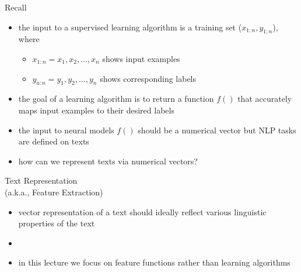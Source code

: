 \begin{frame}{Recall}
    \begin{itemize}
        \item<1-> the input to a supervised learning algorithm is a training set ($x_{1:n}, y_{1:n}$), where
        \begin{itemize}
            \item<2-> $x_{1:n} = x_1,x_2,..., x_n$ shows input examples
            \item<3->  $y_{a:n}= y_1, y_2, ..., y_n$ shows corresponding labels
        \end{itemize}
        \item<4-> the goal of a learning algorithm is to return a function $f()$ that accurately maps input examples to their desired labels
        \item<7-> the input to neural models $f()$ should be a numerical vector but NLP tasks are defined on texts
        \item<8-> how can we represent texts via numerical vectors? 
    \end{itemize}
\end{frame}
\begin{frame}{Text Representation \\ (a.k.a., Feature Extraction)}
    \begin{itemize}
        \item<1->  vector representation of a text should ideally reflect various linguistic properties of the text
        \item<2-> 
        \item<3-> in this lecture we focus on  feature functions rather than learning algorithms
    \end{itemize}
\end{frame}

